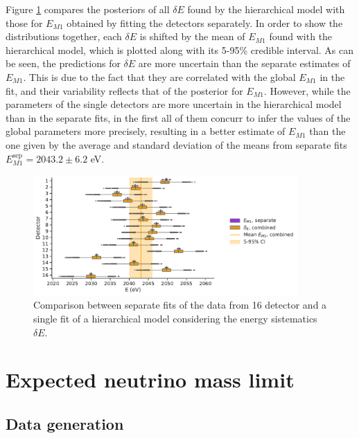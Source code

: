 Figure \ref{fig:systvsM1} compares the posteriors of all $\delta E$ found by the hierarchical model with those
for $E_{M 1}$ obtained by fitting the detectors separately. In order to show the distributions together, each $\delta E$
is shifted by the mean of $E_{M 1}$ found with the hierarchical model, which is plotted along with its 5-95\% credible
interval. As can be seen, the predictions for $\delta E$ are more uncertain than the separate estimates of $E_{M 1}$.
This is due to the fact that they are correlated with the global $E_{M 1}$ in the fit, and their variability reflects
that of the posterior for $E_{M 1}$. However, while the parameters of the single detectors are more uncertain in the
hierarchical model than in the separate fits, in the first all of them concurr to infer the values of the global parameters more precisely, resulting in a better estimate of
$E_{M 1}$ than the one given by the average and standard deviation of the means from separate fits $E_{M1}^{\text{sep}}=2043.2\pm
6.2$ eV.

\begin{figure}[t]
  \centering
  \includegraphics[width=0.9\textwidth]{figures/ch3/peaks/compare_0.pdf}
  \caption{Comparison between separate fits of the data from 16 detector and a single fit of a hierarchical model
  considering the energy sistematics $\delta E$.}
  \label{fig:systvsM1}
\end{figure}

\section{Expected neutrino mass limit}

\subsection{Data generation}

